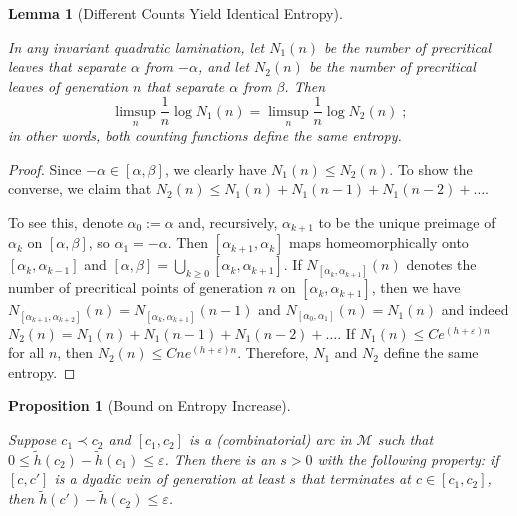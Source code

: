 \documentclass[12pt]{amsart}
\newcommand{\M}{\mathscr M}
\newcommand{\0}{\texttt{0}}
\newcommand{\1}{\texttt{1}}
\newcommand\eps{\varepsilon}
\newtheorem{lemma}[theorem]{Lemma}
\newtheorem{proposition}[theorem]{Proposition}
\theoremstyle{definition}
\numberwithin{equation}{section}
\newcommand{\ovl}[1]{\overline{#1}}
\newcommand{\lineclear}{\rule{0pt}{2pt}\newline}
\newcounter{reminder}[section]
\newcounter{treminder}
\newcommand{\reminder}[1]{\stepcounter{reminder}\stepcounter{treminder}$\rhd$\textsl{#1}$\lhd$\marginpar{\thesection.\arabic{reminder}$\lhd\rhd\lhd\rhd\lhd\rhd$}}
\renewcommand{\reminder}[1]{}
\begin{document}
\begin{lemma}[Different Counts Yield Identical Entropy]
\label{lem:DifferCounts}
\lineclear
In any invariant quadratic lamination, let $N_1(n)$ be the number of precritical leaves that separate $\alpha$ from $-\alpha$, and let $N_2(n)$ be the number of precritical leaves of generation $n$ that separate $\alpha$ from $\beta$. Then
\[
\limsup_n \frac 1 n \log N_1(n) = \limsup_n \frac 1 n \log N_2(n)
\;;
\]
in other words, both counting functions define the same entropy. 
\end{lemma}
\begin{proof}
Since $-\alpha\in[\alpha,\beta]$, we clearly have $N_1(n)\le N_2(n)$. To show the converse, we claim that $N_2(n) \le N_1(n)+N_1(n-1)+ N_1(n-2)+\dots$.

To see this, denote $\alpha_0:=\alpha$ and, recursively, $\alpha_{k+1}$ to be the unique preimage of $\alpha_k$ on $[\alpha,\beta]$, so $\alpha_1=-\alpha$. Then $[\alpha_{k+1},\alpha_k]$ maps homeomorphically onto $[\alpha_k,\alpha_{k-1}]$ and $[\alpha,\beta]=\bigcup_{k\ge 0}[\alpha_{k},\alpha_{k+1}]$. If $N_{[\alpha_k,\alpha_{k+1}]}(n)$ denotes the number of precritical points of generation $n$ on $[\alpha_k,\alpha_{k+1}]$, then we have $N_{[\alpha_{k+1},\alpha_{k+2}]}(n)=N_{[\alpha_k,\alpha_{k+1}]}(n-1)$ and $N_{[\alpha_{0},\alpha_{1}]}(n)=N_1(n)$ and indeed $N_2(n) = N_1(n)+N_1(n-1)+N_1(n-2)+\dots$.  If $N_1(n)\le C e^{(h+\eps)n}$ for all $n$, then $N_2(n)\le C n e^{(h+\eps)n}$. Therefore, $N_1$ and $N_2$ define the same entropy.
\end{proof}




\begin{proposition}[Bound on Entropy Increase]
\label{Prop:BoundEntropyIncrease} \lineclear
Suppose $c_1\prec c_2$ and $[c_1,c_2]$ is a (combinatorial) arc in $\M$ such that $0\le \tilde h(c_2)-\tilde h(c_1)\le \eps$. Then there is an $s>0$ with the following property: if $[c,c']$ is a dyadic vein of generation at least $s$ that terminates at $c\in [c_1,c_2]$, then $\tilde h(c')-\tilde h(c_2)\le \eps$. \end{proposition}
\reminder{Would it be more consistent to use $\ovl m$ for $s$? }
\end{document}
